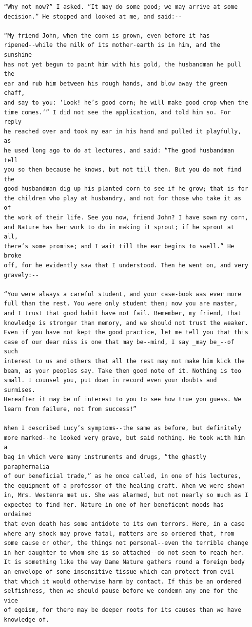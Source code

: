 \documentclass{article}
\begin{document}
\begin{verbatim}
“Why not now?” I asked. “It may do some good; we may arrive at some
decision.” He stopped and looked at me, and said:--

“My friend John, when the corn is grown, even before it has
ripened--while the milk of its mother-earth is in him, and the sunshine
has not yet begun to paint him with his gold, the husbandman he pull the
ear and rub him between his rough hands, and blow away the green chaff,
and say to you: ‘Look! he’s good corn; he will make good crop when the
time comes.’” I did not see the application, and told him so. For reply
he reached over and took my ear in his hand and pulled it playfully, as
he used long ago to do at lectures, and said: “The good husbandman tell
you so then because he knows, but not till then. But you do not find the
good husbandman dig up his planted corn to see if he grow; that is for
the children who play at husbandry, and not for those who take it as of
the work of their life. See you now, friend John? I have sown my corn,
and Nature has her work to do in making it sprout; if he sprout at all,
there’s some promise; and I wait till the ear begins to swell.” He broke
off, for he evidently saw that I understood. Then he went on, and very
gravely:--

“You were always a careful student, and your case-book was ever more
full than the rest. You were only student then; now you are master,
and I trust that good habit have not fail. Remember, my friend, that
knowledge is stronger than memory, and we should not trust the weaker.
Even if you have not kept the good practice, let me tell you that this
case of our dear miss is one that may be--mind, I say _may be_--of such
interest to us and others that all the rest may not make him kick the
beam, as your peoples say. Take then good note of it. Nothing is too
small. I counsel you, put down in record even your doubts and surmises.
Hereafter it may be of interest to you to see how true you guess. We
learn from failure, not from success!”

When I described Lucy’s symptoms--the same as before, but definitely
more marked--he looked very grave, but said nothing. He took with him a
bag in which were many instruments and drugs, “the ghastly paraphernalia
of our beneficial trade,” as he once called, in one of his lectures,
the equipment of a professor of the healing craft. When we were shown
in, Mrs. Westenra met us. She was alarmed, but not nearly so much as I
expected to find her. Nature in one of her beneficent moods has ordained
that even death has some antidote to its own terrors. Here, in a case
where any shock may prove fatal, matters are so ordered that, from
some cause or other, the things not personal--even the terrible change
in her daughter to whom she is so attached--do not seem to reach her.
It is something like the way Dame Nature gathers round a foreign body
an envelope of some insensitive tissue which can protect from evil
that which it would otherwise harm by contact. If this be an ordered
selfishness, then we should pause before we condemn any one for the vice
of egoism, for there may be deeper roots for its causes than we have
knowledge of.


\end{verbatim}
\end{document}
